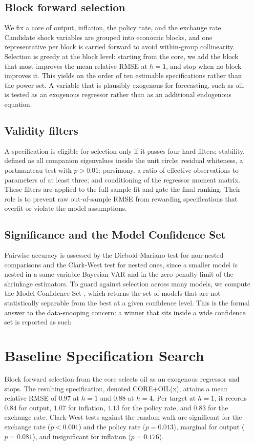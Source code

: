 \documentclass[conference]{IEEEtran}
\begin{document}
\subsection{Block forward selection}
We fix a core of output, inflation, the policy rate, and the exchange rate. Candidate shock variables are grouped into economic blocks, and one representative per block is carried forward to avoid within-group collinearity. Selection is greedy at the block level: starting from the core, we add the block that most improves the mean relative RMSE at $h=1$, and stop when no block improves it. This yields on the order of ten estimable specifications rather than the power set. A variable that is plausibly exogenous for forecasting, such as oil, is tested as an exogenous regressor rather than as an additional endogenous equation.

\subsection{Validity filters}
A specification is eligible for selection only if it passes four hard filters: stability, defined as all companion eigenvalues inside the unit circle; residual whiteness, a portmanteau test with $p>0.01$; parsimony, a ratio of effective observations to parameters of at least three; and conditioning of the regressor moment matrix. These filters are applied to the full-sample fit and gate the final ranking. Their role is to prevent raw out-of-sample RMSE from rewarding specifications that overfit or violate the model assumptions.

\subsection{Significance and the Model Confidence Set}
Pairwise accuracy is assessed by the Diebold-Mariano test \cite{dm1995} for non-nested comparisons and the Clark-West test \cite{cw2007} for nested ones, since a smaller model is nested in a same-variable Bayesian VAR and in the zero-penalty limit of the shrinkage estimators. To guard against selection across many models, we compute the Model Confidence Set \cite{hln2011}, which returns the set of models that are not statistically separable from the best at a given confidence level. This is the formal answer to the data-snooping concern: a winner that sits inside a wide confidence set is reported as such.

\section{Baseline Specification Search}
Block forward selection from the core selects oil as an exogenous regressor and stops. The resulting specification, denoted CORE+OIL(x), attains a mean relative RMSE of $0.97$ at $h=1$ and $0.88$ at $h=4$. Per target at $h=1$, it records $0.84$ for output, $1.07$ for inflation, $1.13$ for the policy rate, and $0.83$ for the exchange rate. Clark-West tests against the random walk are significant for the exchange rate ($p<0.001$) and the policy rate ($p=0.013$), marginal for output ($p=0.081$), and insignificant for inflation ($p=0.176$).
\end{document}
